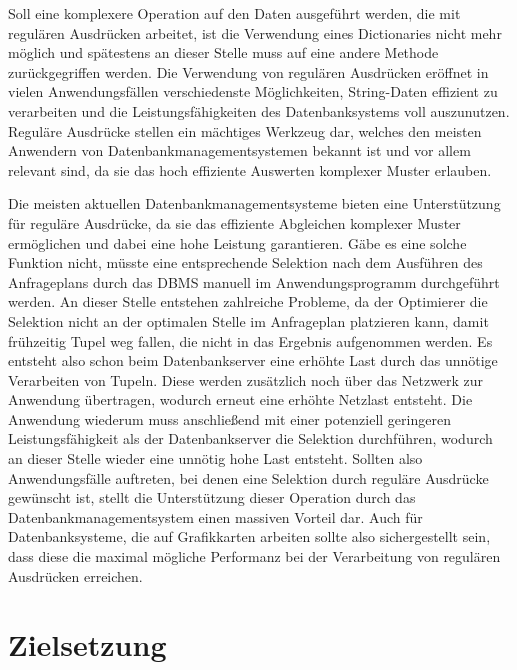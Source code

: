 Soll eine komplexere Operation auf den Daten ausgeführt werden, die mit regulären Ausdrücken arbeitet, ist die Verwendung eines Dictionaries nicht mehr möglich und spätestens an dieser Stelle muss auf eine andere Methode zurückgegriffen werden.
Die Verwendung von regulären Ausdrücken eröffnet in vielen Anwendungsfällen verschiedenste Möglichkeiten, String-Daten effizient zu verarbeiten und die Leistungsfähigkeiten des Datenbanksystems voll auszunutzen.
Reguläre Ausdrücke stellen ein mächtiges Werkzeug dar, welches den meisten Anwendern von Datenbankmanagementsystemen bekannt ist und vor allem relevant sind, da sie das hoch effiziente Auswerten komplexer Muster erlauben.

Die meisten aktuellen Datenbankmanagementsysteme bieten eine Unterstützung für reguläre Ausdrücke, da sie das effiziente Abgleichen komplexer Muster ermöglichen und dabei eine hohe Leistung garantieren.
Gäbe es eine solche Funktion nicht, müsste eine entsprechende Selektion nach dem Ausführen des Anfrageplans durch das DBMS manuell im Anwendungsprogramm durchgeführt werden.
An dieser Stelle entstehen zahlreiche Probleme, da der Optimierer die Selektion nicht an der optimalen Stelle im Anfrageplan platzieren kann, damit frühzeitig Tupel weg fallen, die nicht in das Ergebnis aufgenommen werden.
Es entsteht also schon beim Datenbankserver eine erhöhte Last durch das unnötige Verarbeiten von Tupeln.
Diese werden zusätzlich noch über das Netzwerk zur Anwendung übertragen, wodurch erneut eine erhöhte Netzlast entsteht.
Die Anwendung wiederum muss anschließend mit einer potenziell geringeren Leistungsfähigkeit als der Datenbankserver die Selektion durchführen, wodurch an dieser Stelle wieder eine unnötig hohe Last entsteht.
Sollten also Anwendungsfälle auftreten, bei denen eine Selektion durch reguläre Ausdrücke gewünscht ist, stellt die Unterstützung dieser Operation durch das Datenbankmanagementsystem einen massiven Vorteil dar.
Auch für Datenbanksysteme, die auf Grafikkarten arbeiten sollte also sichergestellt sein, dass diese die maximal mögliche Performanz bei der Verarbeitung von regulären Ausdrücken erreichen.

\section{Zielsetzung}

